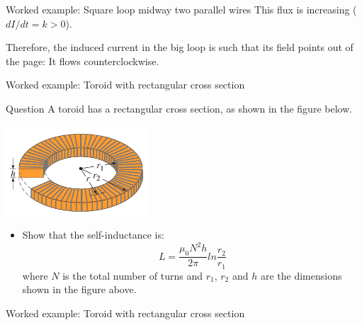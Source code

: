 {\begin{frame}{Worked example: Square loop midway two parallel wires}
   This flux is increasing ($dI/dt = k > 0$).\\
   \vspace{0.1cm}

   Therefore, the induced current in the big loop is such that its field
   points out of the page: It flows counterclockwise.\\

 \end{frame}

} %


%
%

{
\problemslide

%
%
%

\begin{frame}{Worked example: Toroid with rectangular cross section}

  \begin{blockexmplque}{Question}
    A toroid has a rectangular cross section, as shown in the figure below.
    \begin{center}
     \includegraphics[width=0.40\textwidth]{./images/problems/lect11_toroid}\\
    \end{center}
    \vspace{-0.2cm}
    \begin{itemize}
      \item
      Show that the self-inductance is:
      \begin{equation*}
          L = \frac{\mu_0 N^2 h}{2\pi} ln\frac{r_2}{r_1}
      \end{equation*}
      where $N$ is the total number of turns and $r_1$, $r_2$ and $h$
      are the dimensions shown in the figure above.
    \end{itemize}
  \end{blockexmplque}

\end{frame}

%
%
%

\begin{frame}{Worked example: Toroid with rectangular cross section}


\end{frame}}
